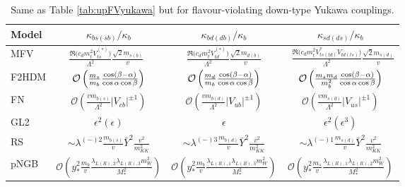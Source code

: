 \documentclass[../report.tex]{subfiles}
\begin{document}
\begin{table}[t]
\begin{center}
\begin{tabular}{l  c  c  c }
\toprule[0.1em]
Model	&   $\kappa_{bs (sb)}/\kappa_b$ & $\kappa_{bd (db)}/\kappa_b$  & $\kappa_{sd (ds)}/\kappa_b$ \\ \midrule[0.05em]\vspace{0.15cm}
MFV &$\frac{\Re\big(c_d m_t^2 V_{ts}^{(*)}\big)}{\Lambda^2} \frac{\sqrt2m_{s(b)}}{v}$~&~$\frac{\Re\big(c_d m_t^2 V_{td}^{(*)}\big)}{\Lambda^2} \frac{\sqrt2 m_{d(b)}}{v}$~&~$\frac{\Re\big(c_d m_t^2 V_{ts(td)}^*V_{td(ts)}\big)}{\Lambda^2} \frac{\sqrt2 m_{s(d)}}{v}$ \\\vspace{0.15cm}
F2HDM & $\mathcal{O}\left(\frac{m_s}{m_b}\frac{\cos(\beta-\alpha)}{\cos\alpha\cos\beta}\right)$ & $\mathcal{O}\left(\frac{m_d}{m_b}\frac{\cos(\beta-\alpha)}{\cos\alpha\cos\beta}\right)$ & $\mathcal{O}\left(\frac{m_s m_d}{m_b^2}\frac{\cos(\beta-\alpha)}{\cos\alpha\cos\beta}\right)$ \\\vspace{0.15cm}
FN &  $\mathcal{O}\left(\frac{v m_{b(s)}}{\Lambda^2} |V_{cb}|^{\pm 1}\right)$ &
	$\mathcal{O}\left(\frac{v m_{b(d)}}{\Lambda^2} |V_{ub}|^{\pm 1}\right)$ &
	$\mathcal{O}\left(\frac{v m_{s(d)}}{\Lambda^2} |V_{us}|^{\pm 1}\right)$\\\vspace{0.15cm}
GL2	&$\epsilon^2 (\epsilon)$ & $\epsilon$ & $\epsilon^2(\epsilon^3)$\\\vspace{0.15cm}
RS & $\sim \lambda^{(-)2} \frac{m_{b(s)}}{v} \bar Y^2\frac{v^2}{m_{KK}^2} $&$\sim \lambda^{(-)3} \frac{m_{b(d)}}{v} \bar Y^2\frac{v^2}{m_{KK}^2} $&$\sim \lambda^{(-)1} \frac{m_{s(d)}}{v} \bar Y^2\frac{v^2}{m_{KK}^2} $ \\\vspace{0.15cm}
pNGB & ${\mathcal O}(y_*^2 \frac{m_b}{v}\frac{\lambda_{L (R),2} \lambda_{L(R),3}m_W^2}{M_*^2})$ & ${\mathcal O}(y_*^2 \frac{m_b}{v}\frac{\lambda_{L (R),1} \lambda_{L(R),3}m_W^2}{M_*^2})$  & ${\mathcal O}(y_*^2 \frac{m_s}{v}\frac{\lambda_{L (R),1} \lambda_{L(R),2}m_W^2}{M_*^2})$\\
\bottomrule[0.1em]
\end{tabular}
\caption{Same as Table \ref{tab:upFVyukawa} but for flavour-violating down-type Yukawa couplings. 
}
\label{tab:downFVyukawa}
\end{center}
\end{table}
\end{document}
